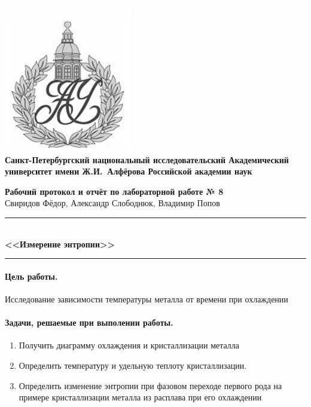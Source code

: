 \documentclass[a4paper]{scrartcl}
\begin{document}
\begin{center}
	\includegraphics[scale=0.25]{AU}\\
	{\Large\bfseries Санкт-Петербургский национальный исследовательский Академический университет имени Ж.И.~Алфёрова Российской академии наук}
\end{center}

\begin{center}
	{\large\textbf{Рабочий протокол и отчёт по лабораторной работе № 8}}\\
	Свиридов Фёдор, Александр Слободнюк, Владимир Попов
\end{center}

\begin{center}
	\rule{12cm}{0.4mm}\\
	\large\bfseries{<<Измерение энтропии>>}\\
	\rule{12cm}{0.4mm}
\end{center}
\paragraph{Цель работы.} Исследование зависимости температуры металла от времени при охлаждении
\paragraph{Задачи, решаемые при выполении работы.}
\begin{enumerate}
	\item Получить диаграмму охлаждения и кристаллизации металла
	\item Определить температуру и удельную теплоту кристаллизации.
	\item Определить изменение энтропии при фазовом переходе первого рода на примере кристаллизации металла из расплава при его охлаждении
\end{enumerate}
\end{document}
